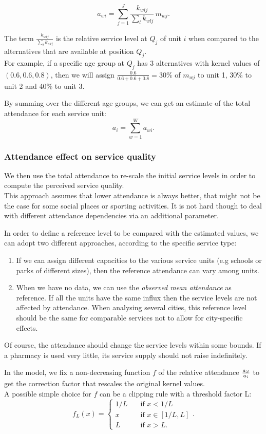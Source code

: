 \documentclass{article}
\begin{document}
    \[a_{wi}=\sum_{j=1}^J{\frac{k_{wij}}{\sum_l{k_{wlj}}} \, m_{wj}}.\]

The term $\frac{k_{wij}}{\sum_l{k_{wlj}}}$ is the relative service level at $Q_j$ of unit $i$ when compared to the alternatives that are available at position $Q_j$. \\
For example, if a specific age group at $Q_j$ has 3 alternatives with kernel values of $(0.6, 0.6, 0.8)$, then we will assign $\frac{0.6}{0.6+0.6+0.8}=30\%$ of $m_{wj}$ to unit 1, 30\% to unit 2 and 40\% to unit 3.

By summing over the different age groups, we can get an estimate of the total attendance for each service unit:
    \[ a_i = \sum_{w=1}^W a_{wi}. \]
    
\subsubsection{Attendance effect on service quality}
We then use the total attendance to re-scale the initial service levels in order to compute the perceived service quality. \\
This approach assumes that lower attendance is always better, that might not be the case for some social places or sporting activities. It is not hard though to deal with different attendance dependencies via an additional parameter.

In order to define a reference level to be compared with the estimated values, we can adopt two different approaches, according to the specific service type:
\begin{enumerate}
    \item If we can assign different capacities to the various service units (e.g schools or parks of different sizes), then the reference attendance can vary among units.
    \item When we have no data, we can use the \textit{observed mean attendance} as reference. If all the units have the same influx then the service levels are not affected by attendance. When analysing several cities, this reference level should be the same for comparable services not to allow for city-specific effects.
\end{enumerate}

Of course, the attendance should change the service levels within some bounds. If a pharmacy is used very little, its service supply should not raise indefinitely.

In the model, we fix a non-decreasing function $f$ of the relative attendance $\frac{\Bar{a}_S}{a_i}$ to get the correction factor that rescales the original kernel values. \\
A possible simple choice for $f$ can be a clipping rule with a threshold factor L:
\[
f_L(x) = \left\{\begin{array}{ll}
    1/L \quad &\text{if } x < 1/L \\
    x \quad &\text{if }  x \in [1/L, L] \\
    L \quad &\text{if }  x > L.
    \end{array} \right..
 \] 
    
\end{document}
